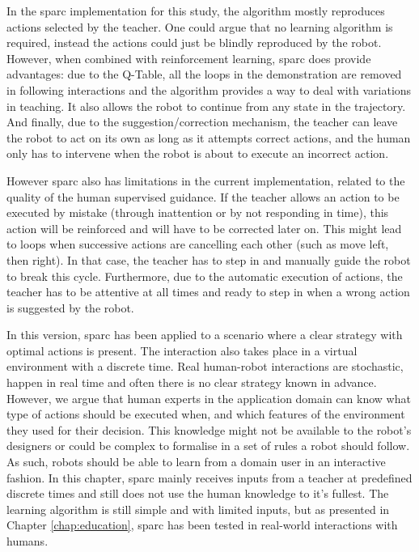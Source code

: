 In the \gls{sparc} implementation for this study, the algorithm mostly reproduces actions selected by the teacher. One could argue that no learning algorithm is required, instead the actions could just be blindly reproduced by the robot. However, when combined with reinforcement learning, \gls{sparc} does provide advantages: due to the Q-Table, all the loops in the demonstration are removed in following interactions and the algorithm provides a way to deal with variations in teaching. It also allows the robot to continue from any state in the trajectory. And finally, due to the suggestion/correction mechanism, the teacher can leave the robot to act on its own as long as it attempts correct actions, and the human only has to intervene when the robot is about to execute an incorrect action. 


However \gls{sparc} also has limitations in the current implementation, related to the quality of the human supervised guidance. If the teacher allows an action to be executed by mistake (through inattention or by not responding in time), this action will be reinforced and will have to be corrected later on. This might lead to loops when successive actions are cancelling each other (such as move left, then right). In that case, the teacher has to step in and manually guide the robot to break this cycle. Furthermore, due to the automatic execution of actions, the teacher has to be attentive at all times and ready to step in when a wrong action is suggested by the robot.

In this version, \gls{sparc} has been applied to a scenario where a clear strategy with optimal actions is present. The interaction also takes place in a virtual environment with a discrete time. Real human-robot interactions are stochastic, happen in real time and often there is no clear strategy known in advance. However, we argue that human experts in the application domain can know what type of actions should be executed when, and which features of the environment they used for their decision. This knowledge might not be available to the robot's designers or could be complex to formalise in a set of rules a robot should follow. As such, robots should be able to learn from a domain user in an interactive fashion. In this chapter, \gls{sparc} mainly receives inputs from a teacher at predefined discrete times and still does not use the human knowledge to it's fullest. The learning algorithm is still simple and with limited inputs, but as presented in Chapter \ref{chap:education},  \gls{sparc} has been tested in real-world interactions with humans.

